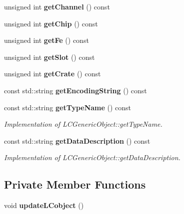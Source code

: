 \begin{DoxyCompactItemize}
\item 
unsigned int {\bfseries get\-Channel} () const \label{classCALICE_1_1DAQconnection_a5578725f9868a3c581425eca90fdd223}

\item 
unsigned int {\bfseries get\-Chip} () const \label{classCALICE_1_1DAQconnection_a4a783e2a4d37608d087479dc255731d2}

\item 
unsigned int {\bfseries get\-Fe} () const \label{classCALICE_1_1DAQconnection_ace1feda8e13487780aff0666eaadc83c}

\item 
unsigned int {\bfseries get\-Slot} () const \label{classCALICE_1_1DAQconnection_af873791c5318dc6496f96c16d1b782a7}

\item 
unsigned int {\bfseries get\-Crate} () const \label{classCALICE_1_1DAQconnection_a6379ea8cfc3e76ab748acae97e25553b}

\item 
const std\-::string {\bfseries get\-Encoding\-String} () const \label{classCALICE_1_1DAQconnection_aa1ccbcccb16b3ff6ace4b0e31c1d87ff}

\item 
const std\-::string {\bf get\-Type\-Name} () const \label{classCALICE_1_1DAQconnection_a25b1407516b5afd73f813662de211d7e}

\begin{DoxyCompactList}\small\item\em Implementation of L\-C\-Generic\-Object\-::get\-Type\-Name. \end{DoxyCompactList}\item 
const std\-::string {\bf get\-Data\-Description} () const \label{classCALICE_1_1DAQconnection_a7b2b9484febf8612c71291028c6675f4}

\begin{DoxyCompactList}\small\item\em Implementation of L\-C\-Generic\-Object\-::get\-Data\-Description. \end{DoxyCompactList}\end{DoxyCompactItemize}
\subsection*{Private Member Functions}
\begin{DoxyCompactItemize}
\item 
void {\bfseries update\-L\-Cobject} ()\label{classCALICE_1_1DAQconnection_a99cde9fbe145d08c6e60ce5946b28814}

\end{DoxyCompactItemize}
